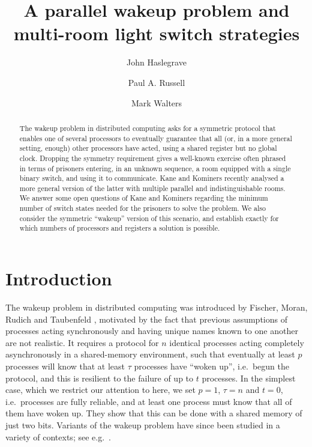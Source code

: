 \documentclass[a4paper,11pt]{extarticle}
\title{A parallel wakeup problem and multi-room light switch strategies}
\author[1]{John Haslegrave}
\author[2]{Paul A. Russell}
\author[3]{Mark Walters}
\affil[1]{Lancaster University}
\affil[2]{Churchill College, Cambridge}
\affil[3]{Queen Mary University of London}
\theoremstyle{definition}
\theoremstyle{remark}
\begin{document}
	\maketitle
	
	\begin{abstract}
		The wakeup problem in distributed computing asks for a symmetric protocol that enables one of several processors to eventually guarantee that all (or, in a more general setting, enough) other processors have acted, using a shared register but no global clock. Dropping the symmetry requirement gives a well-known exercise often phrased in terms of prisoners entering, in an unknown sequence, a room equipped with a single binary switch, and using it to communicate. Kane and Kominers recently analysed a more general version of the latter with multiple parallel and indistinguishable rooms. We answer some open questions of Kane and Kominers regarding the minimum number of switch states needed for the prisoners to solve the problem. We also consider the symmetric ``wakeup'' version of this scenario, and establish exactly for which numbers of processors and registers a solution is possible.
	\end{abstract}
	
	\section{Introduction}
	The wakeup problem in distributed computing was introduced by Fischer, Moran, Rudich and Taubenfeld \cite{FMRT90,FMRT96}, motivated by the fact that previous assumptions of processes acting synchronously and having unique names known to one another are not realistic. It requires a protocol for $n$ identical processes acting completely asynchronously in a shared-memory environment, such that eventually at least $p$ processes will know that at least $\tau$ processes have ``woken up'', i.e.\ begun the protocol, and this is resilient to the failure of up to $t$ processes. In the simplest case, which we restrict our attention to here, we set $p=1$, $\tau=n$ and $t=0$, i.e.\ processes are fully reliable, and at least one process must know that all of them have woken up. They show that this can be done with a shared memory of just two bits. Variants of the wakeup problem have since been studied in a variety of contexts; see e.g.\ \cite{AGM02,JS05,CGK07}.
	
\end{document}
